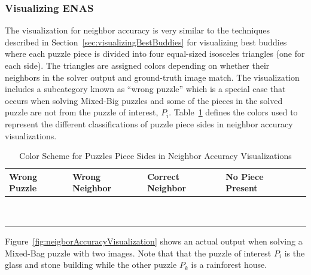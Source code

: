 \documentclass{report}
\begin{document}
\subsubsection{Visualizing ENAS}\label{sec:visualizingNeighborAccuracy}

The visualization for neighbor accuracy is very similar to the techniques described in Section~\ref{sec:visualizingBestBuddies} for visualizing best buddies where each puzzle piece is divided into four equal-sized isosceles triangles (one for each side).  The triangles are assigned colors depending on whether their neighbors in the solver output and ground-truth image match.  The visualization includes a subcategory known as ``wrong puzzle'' which is a special case that occurs when solving Mixed-Big puzzles and some of the pieces in the solved puzzle are not from the puzzle of interest, $P_i$.  Table~\ref{tab:neighborAccuracyColors} defines the colors used to represent the different classifications of puzzle piece sides in neighbor accuracy visualizations.

\begin{table}[h]
\begin{center}
  \begin{tabular}{ | >{\centering\arraybackslash}m{0.6in} | >{\centering\arraybackslash}m{0.6in} | >{\centering\arraybackslash}m{0.6in} | >{\centering\arraybackslash}m{0.6in} | >{\centering\arraybackslash}m{0.6in} | }
 \hline
    Wrong Puzzle & Wrong Neighbor & Correct Neighbor  & No Piece Present  \\ \hline
	{\cellcolor{blue}~} & {\cellcolor{red}~} & {\cellcolor{green}~} & {\cellcolor{black}~}  \\
	{\cellcolor{blue}~} & {\cellcolor{red}~} & {\cellcolor{green}~} & {\cellcolor{black}~}  \\
 \hline
  \end{tabular}
\end{center}
\caption{Color Scheme for Puzzles Piece Sides in Neighbor Accuracy Visualizations}\label{tab:neighborAccuracyColors}
\end{table}

Figure~\ref{fig:neigborAccuracyVisualization} shows an actual output when solving a Mixed-Bag puzzle with two images.  Note that that the puzzle of interest $P_i$ is the glass and stone building while the other puzzle $P_k$ is a rainforest house.
\end{document}
